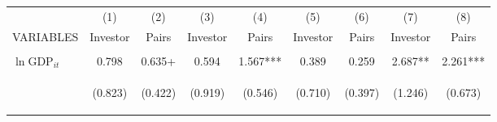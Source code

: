\begin{center}
\begin{tabular}{lcccccccc} \hline
 & (1) & (2) & (3) & (4) & (5) & (6) & (7) & (8) \\
VARIABLES & Investor & Pairs & Investor & Pairs & Investor & Pairs & Investor & Pairs \\ \hline
\vspace{4pt} & \begin{footnotesize}\end{footnotesize} & \begin{footnotesize}\end{footnotesize} & \begin{footnotesize}\end{footnotesize} & \begin{footnotesize}\end{footnotesize} & \begin{footnotesize}\end{footnotesize} & \begin{footnotesize}\end{footnotesize} & \begin{footnotesize}\end{footnotesize} & \begin{footnotesize}\end{footnotesize} \\
$\ln\text{GDP}_{it}$ & 0.798 & 0.635+ & 0.594 & 1.567*** & 0.389 & 0.259 & 2.687** & 2.261*** \\
\vspace{4pt} & \begin{footnotesize}(0.823)\end{footnotesize} & \begin{footnotesize}(0.422)\end{footnotesize} & \begin{footnotesize}(0.919)\end{footnotesize} & \begin{footnotesize}(0.546)\end{footnotesize} & \begin{footnotesize}(0.710)\end{footnotesize} & \begin{footnotesize}(0.397)\end{footnotesize} & \begin{footnotesize}(1.246)\end{footnotesize} & \begin{footnotesize}(0.673)\end{footnotesize} \\

\end{tabular}
\end{center}
